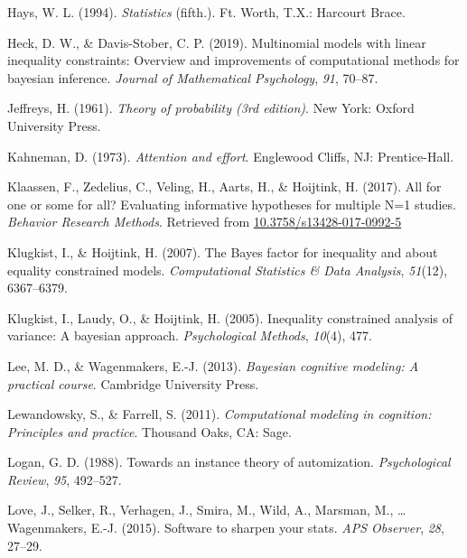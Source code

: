 \documentclass[english,,man]{apa6}
\begin{document}
\leavevmode\hypertarget{ref-Hays:1994}{}%
Hays, W. L. (1994). \emph{Statistics} (fifth.). Ft. Worth, T.X.: Harcourt Brace.

\leavevmode\hypertarget{ref-Heck:Davis-Stober:2019}{}%
Heck, D. W., \& Davis-Stober, C. P. (2019). Multinomial models with linear inequality constraints: Overview and improvements of computational methods for bayesian inference. \emph{Journal of Mathematical Psychology}, \emph{91}, 70--87.

\leavevmode\hypertarget{ref-Jeffreys:1961}{}%
Jeffreys, H. (1961). \emph{Theory of probability (3rd edition)}. New York: Oxford University Press.

\leavevmode\hypertarget{ref-Kahneman:1973}{}%
Kahneman, D. (1973). \emph{Attention and effort}. Englewood Cliffs, NJ: Prentice-Hall.

\leavevmode\hypertarget{ref-Klaassen:etal:2017}{}%
Klaassen, F., Zedelius, C., Veling, H., Aarts, H., \& Hoijtink, H. (2017). All for one or some for all? Evaluating informative hypotheses for multiple N=1 studies. \emph{Behavior Research Methods}. Retrieved from \url{10.3758/s13428-017-0992-5}

\leavevmode\hypertarget{ref-Klugkist:Hoijtink:2007}{}%
Klugkist, I., \& Hoijtink, H. (2007). The Bayes factor for inequality and about equality constrained models. \emph{Computational Statistics \& Data Analysis}, \emph{51}(12), 6367--6379.

\leavevmode\hypertarget{ref-Klugkist:etal:2005}{}%
Klugkist, I., Laudy, O., \& Hoijtink, H. (2005). Inequality constrained analysis of variance: A bayesian approach. \emph{Psychological Methods}, \emph{10}(4), 477.

\leavevmode\hypertarget{ref-Lee:Wagenmakers:2013}{}%
Lee, M. D., \& Wagenmakers, E.-J. (2013). \emph{Bayesian cognitive modeling: A practical course}. Cambridge University Press.

\leavevmode\hypertarget{ref-Lewandowsky:Farrell:2011}{}%
Lewandowsky, S., \& Farrell, S. (2011). \emph{Computational modeling in cognition: Principles and practice}. Thousand Oaks, CA: Sage.

\leavevmode\hypertarget{ref-Logan:1988}{}%
Logan, G. D. (1988). Towards an instance theory of automization. \emph{Psychological Review}, \emph{95}, 492--527.

\leavevmode\hypertarget{ref-Love:etal:2015}{}%
Love, J., Selker, R., Verhagen, J., Smira, M., Wild, A., Marsman, M., \ldots{} Wagenmakers, E.-J. (2015). Software to sharpen your stats. \emph{APS Observer}, \emph{28}, 27--29.
\end{document}
